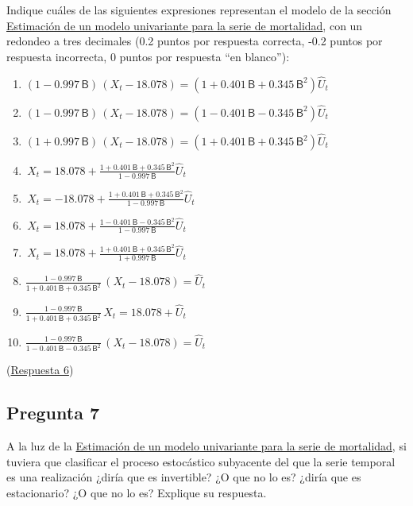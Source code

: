 \documentclass[10pt]{article}
\begin{document}
Indique cuáles de las siguientes expresiones representan el modelo de
la sección \hyperref[sec:orga279f63]{Estimación de un modelo univariante para la serie de mortalidad}, con un redondeo a tres decimales (0.2 puntos por respuesta
correcta, -0.2 puntos por respuesta incorrecta, 0 puntos por respuesta
“en blanco”):

\begin{enumerate}
\item \(\left( 1 - 0.997 \, \mathsf{B} \right) \, \left(X_t - 18.078 \right) = \left( 1 + 0.401 \, \mathsf{B} + 0.345 \, \mathsf{B}^2 \right) \hat U_t\)
\item \(\left( 1 - 0.997 \, \mathsf{B} \right) \, \left(X_t - 18.078 \right) = \left( 1 - 0.401 \, \mathsf{B}  - 0.345 \, \mathsf{B}^2 \right) \hat U_t\)
\item \(\left( 1 + 0.997 \, \mathsf{B} \right) \, \left(X_t - 18.078 \right) = \left( 1 + 0.401 \, \mathsf{B}  + 0.345 \, \mathsf{B}^2 \right) \hat U_t\)
\item \(\,{X_t} = 18.078 + \frac{  1 + 0.401 \, \mathsf{B}  + 0.345 \, \mathsf{B}^2 }{ 1 - 0.997 \, \mathsf{B} } \hat U_t\)
\item \(\,{X_t} = -18.078 + \frac{  1 + 0.401 \, \mathsf{B}  + 0.345 \, \mathsf{B}^2 }{ 1 - 0.997 \, \mathsf{B} } \hat U_t\)
\item \(\,{X_t} = 18.078 + \frac{  1 - 0.401 \, \mathsf{B} - 0.345 \, \mathsf{B}^2 }{ 1 - 0.997 \, \mathsf{B} } \hat U_t\)
\item \(\,{X_t} = 18.078 + \frac{  1 + 0.401 \, \mathsf{B}  + 0.345 \, \mathsf{B}^2 }{ 1 + 0.997 \, \mathsf{B} } \hat U_t\)
\item \(\frac{ 1 - 0.997 \, \mathsf{B} }{1 + 0.401 \, \mathsf{B}  + 0.345 \, \mathsf{B}^2 } \, \left(X_t - 18.078 \right)=  \hat U_t\)
\item \(\frac{ 1 - 0.997 \, \mathsf{B} }{1 + 0.401 \, \mathsf{B}  + 0.345 \, \mathsf{B}^2 } \, X_t = 18.078 + \hat U_t\)
\item \(\frac{ 1 - 0.997 \, \mathsf{B} }{1 - 0.401 \, \mathsf{B} - 0.345 \, \mathsf{B}^2 } \, \left(X_t - 18.078 \right)=  \hat U_t\)
\end{enumerate}

(\hyperref[sec:orgdb7a15e]{Respuesta 6})
\subsection*{Pregunta 7}
\label{sec:org8a4dedf}

A la luz de la \hyperref[sec:orga279f63]{Estimación de un modelo univariante para la serie de mortalidad}, si tuviera que clasificar el proceso estocástico
subyacente del que la serie temporal es una realización ¿diría que es
invertible?  ¿O que no lo es?  ¿diría que es estacionario? ¿O que no
lo es? Explique su respuesta.
\end{document}
